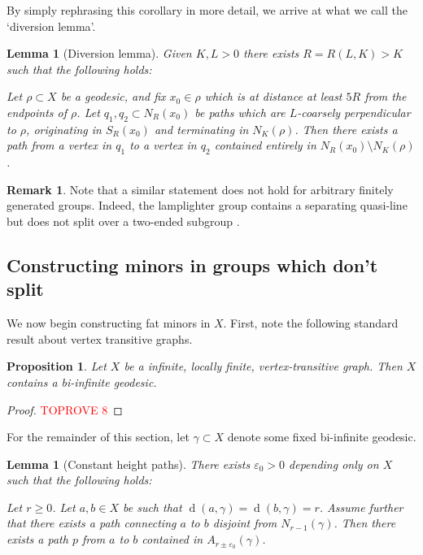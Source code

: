 \documentclass[10pt,a4paper]{amsart}
\DeclareMathOperator{\dist}{d}
\newtheorem{proposition}[theorem]{Proposition}
\newtheorem{lemma}[theorem]{Lemma}
\theoremstyle{definition}
\newtheorem{remark}[theorem]{Remark}
\begin{document}
By simply rephrasing this corollary in more detail, we arrive at what we call the `diversion lemma'. 

\begin{lemma}[Diversion lemma]\label{lem:diversion}
    Given $K, L > 0$ there exists $R = R(L , K) > K$ such that the following holds: 
    
    Let $\rho \subset X$ be a geodesic, and fix $x_0 \in \rho$ which is at distance at least $5R$ from the endpoints of $\rho$. Let $q_1, q_2 \subset N_R(x_0)$ be  paths which are $L$-coarsely perpendicular to $\rho$, originating in $S_R(x_0)$ and terminating in $N_K(\rho)$. Then there exists a path from a vertex in $q_1$ to a vertex in $q_2$ contained entirely in $N_R(x_0) \setminus N_K(\rho)$. 
\end{lemma}




\begin{remark}
	Note that a similar statement does not hold for arbitrary finitely generated groups. Indeed, the lamplighter group contains a separating quasi-line but does not split over a two-ended subgroup \cite{papasoglu2012splittings}. 
\end{remark}

\subsection{Constructing minors in groups which don't split}

We now begin constructing fat minors in $X$. 
First, note the following standard result about vertex transitive graphs.

\begin{proposition}
    Let $X$ be a infinite, locally finite, vertex-transitive graph. Then $X$ contains a bi-infinite geodesic. 
\end{proposition}

\begin{proof}\textcolor{red}{TOPROVE 8}\end{proof}

For the remainder of this section, let $\gamma \subset X$ denote some fixed bi-infinite geodesic.

\begin{lemma}[Constant height paths]\label{lem:constant-height-paths}
There exists $\varepsilon_0 > 0$ depending only on $X$ such that the following holds:   

Let $r \geq 0$. Let $a, b \in X$ be such that 
$
\dist(a, \gamma) = \dist(b, \gamma) = r 
$. 
Assume further that there exists a path connecting $a$ to $b$ disjoint from $N_{r - 1}(\gamma)$. Then there exists a path $p$ from $a$ to $b$ contained in $A_{r\pm\varepsilon_0}(\gamma)$.
\end{lemma}
\end{document}
